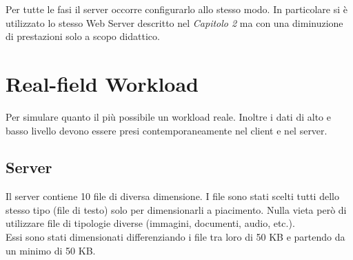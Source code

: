 Per tutte le fasi il server occorre configurarlo allo stesso modo. In particolare si è utilizzato lo stesso Web Server descritto nel \textit{Capitolo 2} ma con una diminuzione di prestazioni solo a scopo didattico.

\section{Real-field Workload}
Per simulare quanto il più possibile un workload reale. Inoltre i dati di alto e basso livello devono essere presi contemporaneamente nel client e nel server.
\subsection{Server}
Il server contiene 10 file di diversa dimensione. I file sono stati scelti tutti dello stesso tipo (file di testo) solo per dimensionarli a piacimento. Nulla vieta però di utilizzare file di tipologie diverse (immagini, documenti, audio, etc.).
\\Essi sono stati dimensionati differenziando i file tra loro di 50 KB e partendo da un minimo di 50 KB.

